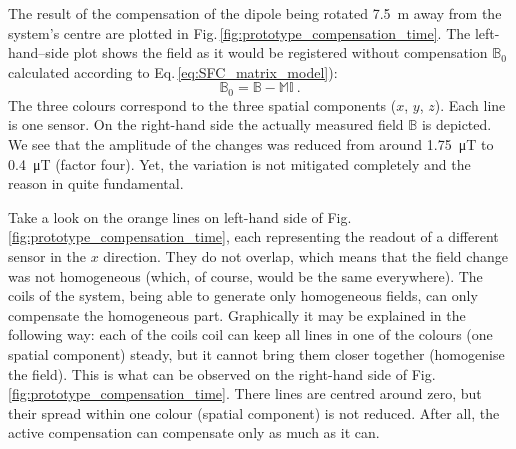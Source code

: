 The result of the compensation of the dipole being rotated \SI{7.5}{\meter} away from the system's centre are plotted in Fig.\,\ref{fig:prototype_compensation_time}. The left-hand--side plot shows the field as it would be registered without compensation $\mathbb{B}_0$ calculated according to Eq.\,\ref{eq:SFC_matrix_model}):
\begin{equation}
  \mathbb{B}_0 = \mathbb{B} - \mathbb{M} \mathbb{I} \ .
\end{equation}
The three colours correspond to the three spatial components ($x$, $y$, $z$). Each line is one sensor. On the right-hand side the actually measured field $\mathbb{B}$ is depicted. We see that the amplitude of the changes was reduced from around \SI{1.75}{\micro\tesla} to \SI{0.4}{\micro\tesla} (factor four). Yet, the variation is not mitigated completely and the reason in quite fundamental.

Take a look on the orange lines on left-hand side of Fig.\,\ref{fig:prototype_compensation_time}, each representing the readout of a different sensor in the $x$ direction. They do not overlap, which means that the field change was not homogeneous (which, of course, would be the same everywhere). The coils of the system, being able to generate only homogeneous fields, can only compensate the homogeneous part. Graphically it may be explained in the following way: each of the coils coil can keep all lines in one of the colours (one spatial component) steady, but it cannot bring them closer together (homogenise the field). This is what can be observed on the right-hand side of Fig.\,\ref{fig:prototype_compensation_time}. There lines are centred around zero, but their spread within one colour (spatial component) is not reduced. After all, the active compensation can compensate only as much as it can.

